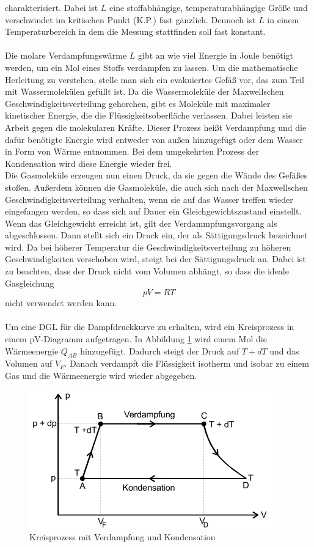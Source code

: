 charakterisiert. Dabei ist $L$ eine stoffabhängige, temperaturabhängige Größe und verschwindet im kritischen Punkt (K.P.) fast gänzlich. Dennoch ist $L$ in einem Temperaturbereich 
in dem die Messung stattfinden soll fast konstant.\\
\\
Die molare Verdampfungswärme $L$ gibt an wie viel Energie in Joule benötigt werden, um ein Mol eines Stoffs verdampfen zu lassen. Um die mathematische Herleitung zu verstehen, stelle
man sich ein evakuiertes Gefäß vor, das zum Teil mit Wassermolekülen gefüllt ist. Da die Wassermoleküle der Maxwellschen Geschwindigkeitsverteilung gehorchen, gibt es Moleküle
mit maximaler kinetischer Energie, die die Flüssigkeitsoberfläche verlassen. Dabei leisten sie Arbeit gegen die molekularen Kräfte. Dieser Prozess
heißt Verdampfung und die dafür benötigte Energie wird entweder von außen hinzugefügt oder dem Wasser in Form von Wärme entnommen. Bei dem umgekehrten Prozess der Kondensation wird
diese Energie wieder frei.\\
Die Gasmoleküle erzeugen nun einen Druck, da sie gegen die Wände des Gefäßes stoßen. Außerdem können die Gasmoleküle, die auch sich nach der Maxwellschen
Geschwindigkeitsverteilung verhalten, wenn sie auf das Wasser treffen wieder eingefangen werden, so dass sich auf Dauer ein Gleichgewichtszustand einstellt. 
Wenn das Gleichgewicht erreicht ist, gilt der Verdammpfungsvorgang als abgeschlossen. Dann stellt sich ein Druck ein, der als Sättigungsdruck bezeichnet wird.
Da bei höherer Temperatur die Geschwindigkeitsverteilung zu höheren Geschwindigkeiten verschoben wird, steigt bei der Sättigungsdruck an. Dabei ist zu beachten, dass der Druck nicht
vom Volumen abhängt, so dass die ideale Gasgleichung
\begin{equation}
    \label{eqn:idealeGasgl}
    pV = RT
\end{equation}
nicht verwendet werden kann.
\\
\\
Um eine DGL für die Dampfdruckkurve zu erhalten, wird ein Kreisprozess in einem pV-Diagramm aufgetragen. In Abbildung \ref{fig:kreisprozess} wird einem Mol die Wärmeenergie 
$Q_{AB}$ hinzugefügt. Dadurch steigt der Druck auf $T+dT$ und das Volumen auf $V_F$. Danach verdampft die Flüssigkeit isotherm und isobar zu einem Gas und die Wärmeenergie
wird wieder abgegeben.
\begin{figure}
    \centering
    \includegraphics{Theorie2.png}
    \caption{Kreisprozess mit Verdampfung und Kondensation}
    \label{fig:kreisprozess}
\end{figure}
